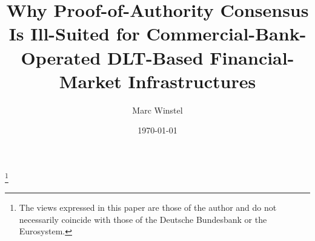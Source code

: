 \documentclass[
reprint,
showkeys,
superscriptaddress,
aps,
pra,
longbibliography,
nofootinbib,
]{revtex4-2}
\theoremstyle{definition}\newtheorem{definition}{Definition}
\begin{document}
	
	
\title{Why Proof-of-Authority Consensus Is Ill-Suited for Commercial-Bank-Operated DLT-Based Financial-Market Infrastructures}
	
	\author{Marc Winstel}
	\thanks{The views expressed in this paper are those of the author and do not necessarily coincide with those of the Deutsche Bundesbank or the Eurosystem.}
	
	\date{\today}
	
\end{document}
